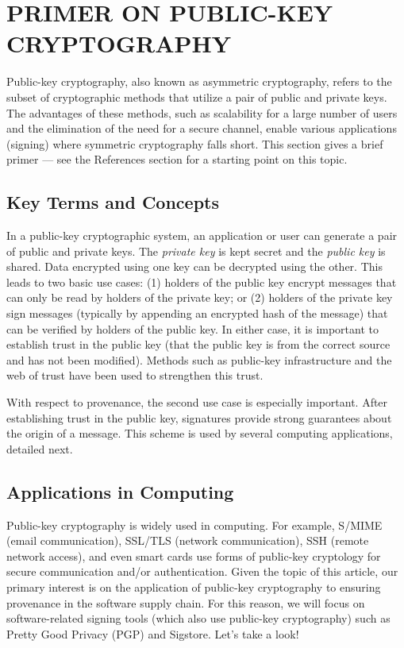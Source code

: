 \documentclass{IEEEcsmagTechrxiv}
\begin{document}
\section{PRIMER ON PUBLIC-KEY CRYPTOGRAPHY}

Public-key cryptography, also known as asymmetric cryptography, refers to the subset of cryptographic methods that utilize a pair of public and private keys.
The advantages of these methods, such as scalability for a large number of users and the elimination of the need for a secure channel, enable various applications (\eg signing) where symmetric cryptography falls short.
This section gives a brief primer --- see the References section for a starting point on this topic.

\subsection{Key Terms and Concepts}
In a public-key cryptographic system, an application or user can generate a pair of public and private keys.
The \textit{private key} is kept secret and the \textit{public key} is shared.
Data encrypted using one key can be decrypted using the other.
This leads to two basic use cases:
(1) holders of the public key encrypt messages that can only be read by holders of the private key; or
(2) holders of the private key sign messages (typically by appending an encrypted hash of the message) that can be verified by holders of the public key.
In either case, it is important to establish trust in the public key (\ie that the public key is from the correct source and has not been modified).
Methods such as public-key infrastructure and the web of trust have been used to strengthen this trust.

With respect to provenance, the second use case is especially important.
After establishing trust in the public key, signatures provide strong guarantees about the origin of a message.
This scheme is used by several computing applications, detailed next.

\subsection{Applications in Computing}
Public-key cryptography is widely used in computing.
For example, S/MIME (email communication), SSL/TLS (network communication), SSH (remote network access), and even smart cards use forms of public-key cryptology for secure communication and/or authentication.
Given the topic of this article, our primary interest is on the application of public-key cryptography to ensuring provenance in the software supply chain.
For this reason, we will focus on software-related signing tools (which also use public-key cryptography) such as Pretty Good Privacy (PGP) and Sigstore.
Let's take a look!
\end{document}
